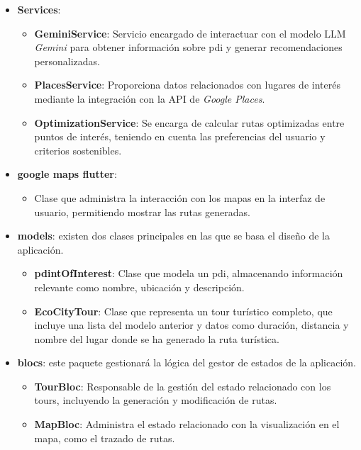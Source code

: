 \begin{itemize}
	\item \textbf{Services}:
	\begin{itemize}
		\item \textbf{GeminiService}: Servicio encargado de interactuar con el modelo LLM \textit{Gemini} para obtener información sobre \acrlong{pdi} y generar recomendaciones personalizadas.
		\item \textbf{PlacesService}: Proporciona datos relacionados con lugares de interés mediante la integración con la API de \textit{Google Places}.
		\item \textbf{OptimizationService}: Se encarga de calcular rutas optimizadas entre puntos de interés, teniendo en cuenta las preferencias del usuario y criterios sostenibles.
	\end{itemize}
	
	\item \textbf{google maps flutter}:
	\begin{itemize}
		\item Clase que administra la interacción con los mapas en la interfaz de usuario, permitiendo mostrar las rutas generadas.
	\end{itemize}
	
	\item \textbf{models}: existen dos clases principales en las que se basa el diseño de la aplicación.
	\begin{itemize}
		\item \textbf{\acrshort{pdi}ntOfInterest}: Clase que modela un \acrlong{pdi}, almacenando información relevante como nombre, ubicación y descripción. 
		\item \textbf{EcoCityTour}: Clase que representa un tour turístico completo, que incluye una lista del modelo anterior y datos como duración, distancia y nombre del lugar donde se ha generado la ruta turística.
	\end{itemize}
	
	\item \textbf{blocs}: este paquete gestionará la lógica del gestor de estados de la aplicación.
	\begin{itemize}
		\item \textbf{TourBloc}: Responsable de la gestión del estado relacionado con los tours, incluyendo la generación y modificación de rutas.
		\item \textbf{MapBloc}: Administra el estado relacionado con la visualización en el mapa, como el trazado de rutas.
	\end{itemize}
	

\end{itemize}
